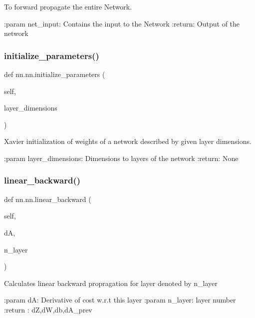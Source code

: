 \begin{DoxyVerb}To forward propagate the entire Network.

:param net_input: Contains the input to the Network
:return: Output of the network
\end{DoxyVerb}
 \mbox{\label{classnn_1_1nn_a9821fed1369b4d709fe297fe9e07d97b}} 
\subsubsection{\texorpdfstring{initialize\+\_\+parameters()}{initialize\_parameters()}}
{\footnotesize\ttfamily def nn.\+nn.\+initialize\+\_\+parameters (\begin{DoxyParamCaption}\item[{}]{self,  }\item[{}]{layer\+\_\+dimensions }\end{DoxyParamCaption})}

\begin{DoxyVerb}Xavier initialization of weights of a network described by given layer
dimensions.

:param layer_dimensions: Dimensions to layers of the network
:return: None
\end{DoxyVerb}
 \mbox{\label{classnn_1_1nn_a0863e90359fa30486c7161cd31c5b4e7}} 
\subsubsection{\texorpdfstring{linear\+\_\+backward()}{linear\_backward()}}
{\footnotesize\ttfamily def nn.\+nn.\+linear\+\_\+backward (\begin{DoxyParamCaption}\item[{}]{self,  }\item[{}]{dA,  }\item[{}]{n\+\_\+layer }\end{DoxyParamCaption})}

\begin{DoxyVerb}Calculates linear backward propragation for layer denoted by n_layer

:param dA: Derivative of cost w.r.t this layer
:param n_layer: layer number
:return : dZ,dW,db,dA_prev
\end{DoxyVerb}
 \mbox{\label{classnn_1_1nn_ae74a0f21e8722ea82a0f94135a81a348}} 
